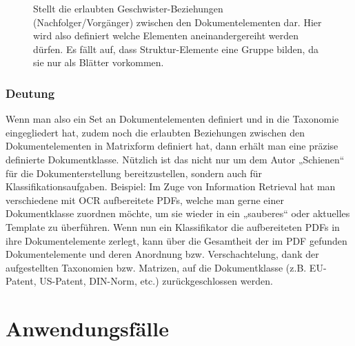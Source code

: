  
\begin{figure}[h!]
\centering
{}
\caption[Matrix über Geschwister-Beziehungen]{ Stellt die erlaubten Geschwister-Beziehungen (Nachfolger/Vorgänger) zwischen den Dokumentelementen dar. Hier wird also definiert welche Elementen aneinandergereiht werden dürfen. Es fällt auf, dass Struktur-Elemente eine Gruppe bilden, da sie nur als Blätter vorkommen. }\label{matrixgeschwister}
\end{figure}
 
\subsection{Deutung}\label{}
 
Wenn man also ein Set an Dokumentelementen definiert und in die Taxonomie eingegliedert hat, zudem noch die erlaubten Beziehungen zwischen den Dokumentelementen in Matrixform definiert hat, dann erhält man eine präzise definierte Dokumentklasse. Nützlich ist das nicht nur um dem Autor „Schienen“ für die Dokumenterstellung bereitzustellen, sondern auch für Klassifikationsaufgaben. Beispiel: Im Zuge von Information Retrieval hat man verschiedene mit OCR aufbereitete PDFs, welche man gerne einer Dokumentklasse zuordnen möchte, um sie wieder in ein „sauberes“ oder aktuelles Template zu überführen. Wenn nun ein Klassifikator die aufbereiteten PDFs in ihre Dokumentelemente zerlegt, kann über die Gesamtheit der im PDF gefunden Dokumentelemente und deren Anordnung bzw. Verschachtelung, dank der aufgestellten Taxonomien bzw. Matrizen, auf die Dokumentklasse (z.B. EU-Patent, US-Patent, DIN-Norm, etc.) zurückgeschlossen werden.

 
\chapter{Anwendungsfälle}\label{}
 
